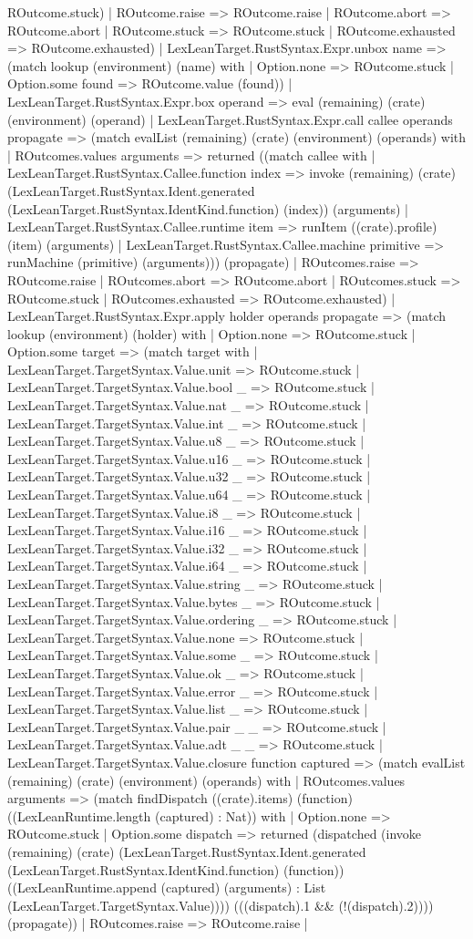 \documentclass[11pt]{article}
\begin{document}
ROutcome.stuck) | ROutcome.raise => ROutcome.raise | ROutcome.abort => ROutcome.abort | ROutcome.stuck => ROutcome.stuck | ROutcome.exhausted => ROutcome.exhausted) | LexLeanTarget.RustSyntax.Expr.unbox name => (match lookup (environment) (name) with | Option.none => ROutcome.stuck | Option.some found => ROutcome.value (found)) | LexLeanTarget.RustSyntax.Expr.box operand => eval (remaining) (crate) (environment) (operand) | LexLeanTarget.RustSyntax.Expr.call callee operands propagate => (match evalList (remaining) (crate) (environment) (operands) with | ROutcomes.values arguments => returned ((match callee with | LexLeanTarget.RustSyntax.Callee.function index => invoke (remaining) (crate) (LexLeanTarget.RustSyntax.Ident.generated (LexLeanTarget.RustSyntax.IdentKind.function) (index)) (arguments) | LexLeanTarget.RustSyntax.Callee.runtime item => runItem ((crate).profile) (item) (arguments) | LexLeanTarget.RustSyntax.Callee.machine primitive => runMachine (primitive) (arguments))) (propagate) | ROutcomes.raise => ROutcome.raise | ROutcomes.abort => ROutcome.abort | ROutcomes.stuck => ROutcome.stuck | ROutcomes.exhausted => ROutcome.exhausted) | LexLeanTarget.RustSyntax.Expr.apply holder operands propagate => (match lookup (environment) (holder) with | Option.none => ROutcome.stuck | Option.some target => (match target with | LexLeanTarget.TargetSyntax.Value.unit => ROutcome.stuck | LexLeanTarget.TargetSyntax.Value.bool \_ => ROutcome.stuck | LexLeanTarget.TargetSyntax.Value.nat \_ => ROutcome.stuck | LexLeanTarget.TargetSyntax.Value.int \_ => ROutcome.stuck | LexLeanTarget.TargetSyntax.Value.u8 \_ => ROutcome.stuck | LexLeanTarget.TargetSyntax.Value.u16 \_ => ROutcome.stuck | LexLeanTarget.TargetSyntax.Value.u32 \_ => ROutcome.stuck | LexLeanTarget.TargetSyntax.Value.u64 \_ => ROutcome.stuck | LexLeanTarget.TargetSyntax.Value.i8 \_ => ROutcome.stuck | LexLeanTarget.TargetSyntax.Value.i16 \_ => ROutcome.stuck | LexLeanTarget.TargetSyntax.Value.i32 \_ => ROutcome.stuck | LexLeanTarget.TargetSyntax.Value.i64 \_ => ROutcome.stuck | LexLeanTarget.TargetSyntax.Value.string \_ => ROutcome.stuck | LexLeanTarget.TargetSyntax.Value.bytes \_ => ROutcome.stuck | LexLeanTarget.TargetSyntax.Value.ordering \_ => ROutcome.stuck | LexLeanTarget.TargetSyntax.Value.none => ROutcome.stuck | LexLeanTarget.TargetSyntax.Value.some \_ => ROutcome.stuck | LexLeanTarget.TargetSyntax.Value.ok \_ => ROutcome.stuck | LexLeanTarget.TargetSyntax.Value.error \_ => ROutcome.stuck | LexLeanTarget.TargetSyntax.Value.list \_ => ROutcome.stuck | LexLeanTarget.TargetSyntax.Value.pair \_ \_ => ROutcome.stuck | LexLeanTarget.TargetSyntax.Value.adt \_ \_ => ROutcome.stuck | LexLeanTarget.TargetSyntax.Value.closure function captured => (match evalList (remaining) (crate) (environment) (operands) with | ROutcomes.values arguments => (match findDispatch ((crate).items) (function) ((LexLeanRuntime.length (captured) : Nat)) with | Option.none => ROutcome.stuck | Option.some dispatch => returned (dispatched (invoke (remaining) (crate) (LexLeanTarget.RustSyntax.Ident.generated (LexLeanTarget.RustSyntax.IdentKind.function) (function)) ((LexLeanRuntime.append (captured) (arguments) : List (LexLeanTarget.TargetSyntax.Value)))) (((dispatch).1 \&\& (!(dispatch).2)))) (propagate)) | ROutcomes.raise => ROutcome.raise | 
\end{document}

